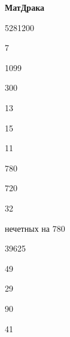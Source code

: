 \centerline{\bf \Huge МатДрака}

 5281200

 7

 1099

 300

 13

 15

 11

 780

 720

 32

 нечетных на 780

 39625

 49

 29

 90

 41